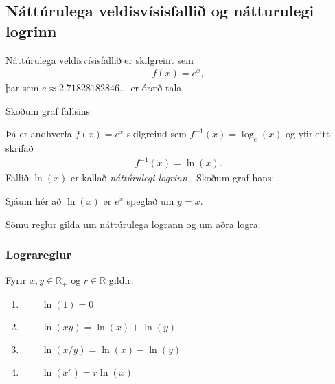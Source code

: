\documentclass[a4paper,10pt,icelandic]{sphinxmanual}
\begin{document}
\subsection{Náttúrulega veldisvísisfallið og nátturulegi logrinn}
\label{\detokenize{Kafli09:natturulega-veldisvisisfalli-og-natturulegi-logrinn}}
Náttúrulega veldisvísisfallið er skilgreint sem
\begin{equation*}
\begin{split}f(x) = e^x,\end{split}
\end{equation*}
þar sem \(e \approx 2.71828182846...\) er óræð tala.

Skoðum graf fallsins


Þá er andhverfa \(f(x) = e^x\) skilgreind sem \(f^{-1}(x) = \log_e (x)\) og yfirleitt skrifað
\begin{equation*}
\begin{split}f^{-1}(x) = \ln(x).\end{split}
\end{equation*}
Fallið \(\ln(x)\) er kallað \textit{náttúrulegi logrinn} .
Skoðum graf hans:


Sjáum hér að \(\ln(x)\) er \(e^x\) speglað um \(y=x\).


Sömu reglur gilda um náttúrulega logrann og um aðra logra.


\subsubsection{Lograreglur}
\label{\detokenize{Kafli09:id4}}
Fyrir \(x,y\in \mathbb{R}_+\) og \(r \in \mathbb{R}\) gildir:
\begin{enumerate}
%
\item {} 
\(\qquad \ln(1)=0\)

\item {} 
\(\qquad \ln(xy)=\ln(x)+\ln(y)\)

\item {} 
\(\qquad \ln(x/y)=\ln(x)-\ln(y)\)

\item {} 
\(\qquad \ln(x^r)=r\ln(x)\)

\end{enumerate}
\end{document}
